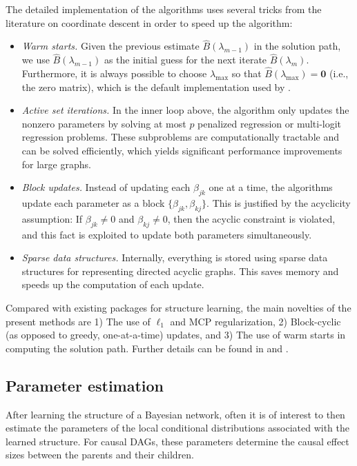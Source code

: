 \documentclass[article]{jss}
\newcommand{\dagmat}{B}
\newcommand{\dagest}{\widehat{\dagmat}}
\renewcommand{\|}{\,|\,}
\begin{document}
The detailed implementation of the algorithms uses several tricks from the literature on coordinate descent in order to speed up the algorithm:
\begin{itemize}
\item \emph{Warm starts.} Given the previous estimate $\dagest(\lambda_{m-1})$ in the solution path, we use $\dagest(\lambda_{m-1})$ as the initial guess for the next iterate $\dagest(\lambda_{m})$. Furthermore, it is always possible to choose $\lambda_{\max}$ so that $\dagest(\lambda_{\max})=\mathbf{0}$ (i.e., the zero matrix), which is the default implementation used by .
\item \emph{Active set iterations.} In the inner loop above, the algorithm only updates the nonzero parameters by solving at most $p$ penalized regression or multi-logit regression problems. These subproblems are computationally tractable and can be solved efficiently, which yields significant performance improvements for large graphs.
\item \emph{Block updates.} Instead of updating each $\beta_{jk}$ one at a time, the algorithms update each parameter as a block $\{\beta_{jk},\beta_{kj}\}$. This is justified by the acyclicity assumption: If $\beta_{jk}\ne 0$ and $\beta_{kj}\ne 0$, then the acyclic constraint is violated, and this fact is exploited to update both parameters simultaneously.
\item \emph{Sparse data structures.} Internally, everything is stored using sparse data structures for representing directed acyclic graphs. This saves memory and speeds up the computation of each update.
\end{itemize}

\noindent
Compared with existing packages for structure learning, the main novelties of the present methods are 1) The use of $\ell_{1}$ and MCP regularization, 2) Block-cyclic (as opposed to greedy, one-at-a-time) updates, and 3) The use of warm starts in computing the solution path. Further details can be found in \citet{fu2013} and \citet{aragam2015}.

\subsection{Parameter estimation}
\label{subsec:paraminference}

After learning the structure of a Bayesian network, often it is of interest to then estimate the parameters of the local conditional distributions associated with the learned structure. For causal DAGs, these parameters determine the causal effect sizes between the parents and their children.
\end{document}
